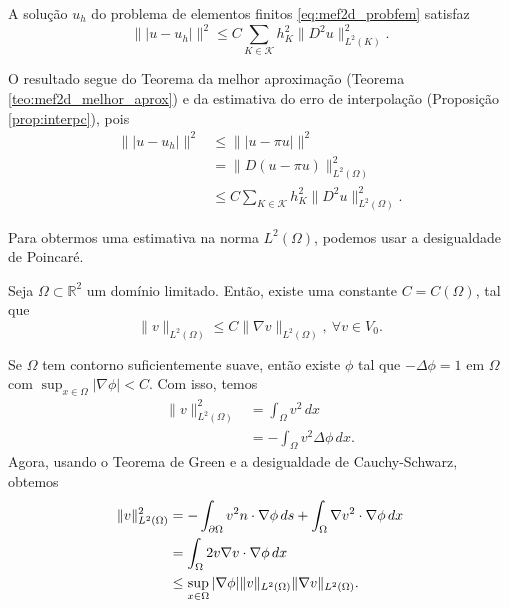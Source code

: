 \begin{teo}\label{teo:mef2d_est_apriori_energia}
  A solução $u_h$ do problema de elementos finitos \eqref{eq:mef2d_probfem} satisfaz
  \begin{equation}
    \||u-u_h|\|^2 \leq C\sum_{K\in\mathcal{K}} h_K^2\|D^2u\|_{L^2(K)}^2.
  \end{equation}
\end{teo}
\begin{dem}
  O resultado segue do Teorema da melhor aproximação (Teorema \ref{teo:mef2d_melhor_aprox}) e da estimativa do erro de interpolação (Proposição \ref{prop:interpc}), pois
  \begin{align}
    \||u-u_h|\|^2 &\leq \||u-\pi u|\|^2\\
    &= \|D(u-\pi u)\|_{L^2(\Omega)}^2\\
    &\leq C\sum_{K\in\mathcal{K}} h_K^2\|D^2u\|_{L^2(\Omega)}^2.
  \end{align}
\end{dem}

Para obtermos uma estimativa na norma $L^2(\Omega)$, podemos usar a desigualdade de Poincaré.

\begin{teo}
  Seja $\Omega\subset \mathbb{R}^2$ um domínio limitado. Então, existe uma constante $C = C(\Omega)$, tal que
  \begin{equation}
    \|v\|_{L^2(\Omega)} \leq C\|\nabla v\|_{L^2(\Omega)},~\forall v\in V_0.
  \end{equation}
\end{teo}
\begin{dem}
  Se $\Omega$ tem contorno suficientemente suave, então existe $\phi$ tal que $-\Delta \phi = 1$ em $\Omega$ com $\sup_{x\in\Omega}|\nabla \phi| < C$. Com isso, temos
  \begin{align}
    \|v\|_{L^2(\Omega)}^2 &= \int_{\Omega} v^2\,dx\\
    &= -\int_{\Omega} v^2\Delta\phi\,dx.
  \end{align}
Agora, usando o Teorema de Green e a desigualdade de Cauchy-Schwarz, obtemos
\begin{align}
  \|v\|_{L^2(\Omega)}^2 &= -\int_{\partial\Omega} v^2n\cdot\nabla \phi\,ds + \int_\Omega \nabla v^2\cdot\nabla \phi\,dx\\
  &= \int_\Omega 2v\nabla v\cdot\nabla \phi\,dx\\
  &\leq \sup_{x\in\Omega} |\nabla \phi|\|v\|_{L^2(\Omega)}\|\nabla v\|_{L^2(\Omega)}.
\end{align}
\end{dem}

